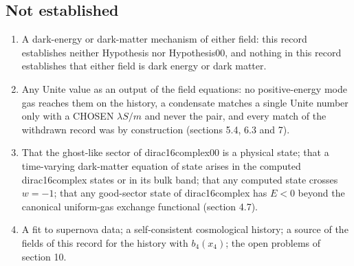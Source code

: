 \documentclass[11pt]{article}
\begin{document}
\subsection{Not established}

\begin{enumerate}
\item A dark-energy or dark-matter mechanism of either field: this record establishes neither Hypothesis nor Hypothesis00, and nothing in this record establishes that either field is dark energy or dark matter.
\item Any Unite value as an output of the field equations: no positive-energy mode gas reaches them on the history, a condensate matches a single Unite number only with a CHOSEN $\lambda S/m$ and never the pair, and every match of the withdrawn record was by construction (sections 5.4, 6.3 and 7).
\item That the ghost-like sector of dirac16complex00 is a physical state; that a time-varying dark-matter equation of state arises in the computed dirac16complex states or in its bulk band; that any computed state crosses $w = -1$; that any good-sector state of dirac16complex has $E < 0$ beyond the canonical uniform-gas exchange functional (section 4.7).
\item A fit to supernova data; a self-consistent cosmological history; a source of the fields of this record for the history with $b_4(x_4)$; the open problems of section 10.
\end{enumerate}
\end{document}
